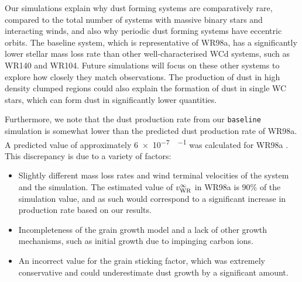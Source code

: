 Our simulations explain why dust forming systems are comparatively rare, compared to the total number of systems with massive binary stars and interacting winds, and also why periodic dust forming systems have eccentric orbits.
The baseline system, which is representative of WR98a, has a significantly lower stellar mass loss rate than other well-characterised WCd systems, such as WR140 and WR104.
Future simulations will focus on these other systems
to explore how closely they match observations.
The production of dust in high density clumped regions could also explain the formation of dust in single WC stars, which can form dust in significantly lower quantities.

Furthermore, we note that the dust production rate from our \texttt{baseline} simulation is somewhat lower than the predicted dust production rate of WR98a.
A predicted value of approximately \SI{6e-7}{\solarmass\per\year} was calculated for WR98a \parencite{lauRevisitingImpactDust2020}.
This discrepancy is due to a variety of factors:

\begin{itemize}
  \item Slightly different mass loss rates and wind terminal velocities of the system and the simulation. The estimated value of $v^\infty_\text{WR}$ in WR98a is 90\% of the simulation value, and as such would correspond to a significant increase in production rate based on our results.
  \item Incompleteness of the grain growth model and a lack of other growth mechanisms, such as initial growth due to impinging carbon ions.
  \item An incorrect value for the grain sticking factor, which was extremely conservative and could underestimate dust growth by a significant amount.
\end{itemize}

